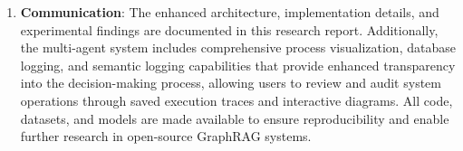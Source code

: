 \begin{enumerate}
    \item \textbf{Communication}: The enhanced architecture, implementation details, and experimental findings are documented in this research report. Additionally, the multi-agent system includes comprehensive process visualization, database logging, and semantic logging capabilities that provide enhanced transparency into the decision-making process, allowing users to review and audit system operations through saved execution traces and interactive diagrams. All code, datasets, and models are made available to ensure reproducibility and enable further research in open-source GraphRAG systems.
\end{enumerate}



